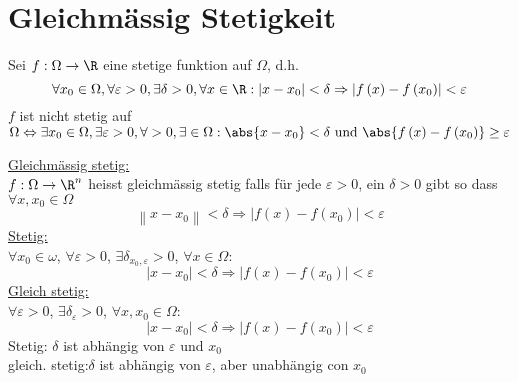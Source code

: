 \section{Gleichmässig Stetigkeit}
Sei $f:\Omega\to\R$ eine stetige funktion auf $\Omega$, d.h. 
\[\forall {x_0} \in \Omega ,\forall \varepsilon  > 0,\exists \delta  > 0,\forall x \in \R :\left| {x - {x_0}} \right| < \delta  \Rightarrow \left| {f\left( x \right) - f\left( {{x_0}} \right)} \right| < \varepsilon \]
$f$ ist nicht stetig auf $\Omega\Leftrightarrow\exists x_0\in\Omega,\exists\varepsilon>0,\forall>0,\exists\in\Omega:\abs{x-x_0}<\delta\text{ und }\abs{f\left( x\right)-f\left( x_0\right)}\geq\varepsilon$

\begin{definition}{4.24}
\underline{Gleichmässig stetig:} \vspace{2mm}\\
$f:\Omega\to\R^n$ heisst gleichmässig stetig falls für jede $\varepsilon>0$, ein $\delta>0$ gibt so dass $\forall x,x_0\in\Omega$
\[\left\| {x - {x_0}} \right\| < \delta  \Rightarrow \left| {f\left( x \right) - f\left( {{x_0}} \right)} \right| < \varepsilon \]
\underline{Stetig:} \vspace{2mm}\\
$\forall x_0\in\omega$, $\forall \varepsilon>0$, $\exists\delta_{x_0,\varepsilon}>0$, $\forall x\in\Omega$:
\[\left| {x - {x_0}} \right| < \delta  \Rightarrow \left| {f\left( x \right) - f\left( {{x_0}} \right)} \right| < \varepsilon \]
\underline{Gleich stetig:} \vspace{2mm}\\
$\forall \varepsilon>0$, $\exists\delta_{\varepsilon}>0$, $\forall x,x_0\in\Omega$:
\[\left| {x - {x_0}} \right| < \delta  \Rightarrow \left| {f\left( x \right) - f\left( {{x_0}} \right)} \right| < \varepsilon \]
Stetig: $\delta$ ist abhängig von $\varepsilon$ und $x_0$\\
gleich. stetig:$\delta$ ist abhängig von $\varepsilon$, aber unabhängig con $x_0$
\end{definition}

